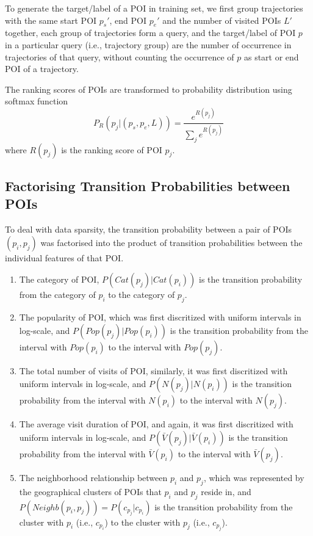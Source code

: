 \documentclass{sig-alternate-05-2015}
\begin{document}
To generate the target/label of a POI in training set,
we first group trajectories with the same start POI $p_s'$, end POI $p_e'$ and the number of visited POIs $L'$ together,
each group of trajectories form a query,
and the target/label of POI $p$ in a particular query (i.e., trajectory group) are the number of occurrence
in trajectories of that query, 
without counting the occurrence of $p$ as start or end POI of a trajectory.

The ranking scores of POIs are transformed to probability distribution using softmax function
\begin{displaymath}
    P_R(p_j |(p_s, p_e, L)) = \frac{e^{R(p_j)}}{\sum_j e^{R(p_j)}}
\end{displaymath}
where $R(p_j)$ is the ranking score of POI $p_j$.


\subsection{Factorising Transition Probabilities between POIs}
\label{method:transition}
To deal with data sparsity,
the transition probability between a pair of POIs $(p_i, p_j)$ was factorised into the product of
transition probabilities between the individual features of that POI.
\begin{enumerate}
\item The category of POI, $P(Cat(p_j) | Cat(p_i))$
      is the transition probability from the category of $p_i$ to the category of $p_j$.
\item The popularity of POI, which was first discritized with uniform intervals in log-scale,
      and $P(Pop(p_j) | Pop(p_i))$ is the transition probability from the interval with $Pop(p_i)$ 
      to the interval with $Pop(p_j)$.
\item The total number of visits of POI, similarly, it was first discritized with uniform intervals in log-scale,
      and $P(N(p_j) | N(p_i))$ is the transition probability from the interval with $N(p_i)$ 
      to the interval with $N(p_j)$.
\item The average visit duration of POI, and again, it was first discritized with uniform intervals in log-scale,
      and $P(\bar{V}(p_j) | \bar{V}(p_i))$ is the transition probability from the interval with $\bar{V}(p_i)$ 
      to the interval with $\bar{V}(p_j)$.
\item The neighborhood relationship between $p_i$ and $p_j$,
      which was represented by the geographical clusters of POIs that $p_i$ and $p_j$ reside in,
      and $P(Neighb(p_i, p_j)) = P(c_{p_j} | c_{p_i})$ is the transition probability from the cluster with 
      $p_i$ (i.e., $c_{p_i}$) to the cluster with $p_j$ (i.e., $c_{p_j}$).
\end{enumerate}
\end{document}
